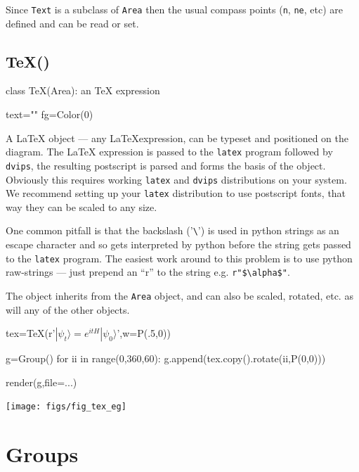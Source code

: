 \documentclass[a4paper]{book}
\begin{document}
Since \Verb|Text| is a subclass of \Verb|Area| then the usual compass points
(\Verb|n|, \Verb|ne|, etc) are defined and can be read or set.

\subsection{TeX()}
\label{sec:tex}
\begin{python}
class TeX(Area):
    an TeX expression

    text=""
    fg=Color(0)
\end{python}

A \LaTeX{} object --- any \LaTeX expression, can be typeset and
positioned on the diagram.  The \LaTeX{} expression is passed to the
\Verb|latex| program followed by \Verb|dvips|, the resulting
postscript is parsed and forms the basis of the object. Obviously this
requires working \Verb|latex| and \Verb|dvips| distributions on your
system. We recommend setting up your \Verb|latex| distribution to
use postscript fonts, that way they can be scaled to any size.

One common pitfall is that the backslash ('\Verb|\|') is used in python
strings as an escape character and so gets interpreted by python before
the string gets passed to the \Verb|latex| program. The easiest work
around to this problem is to use python raw-strings --- just prepend an
``r'' to the string e.g. \Verb|r"$\alpha$"|.

The object inherits from the \Verb|Area| object, and can also be
scaled, rotated, etc. as will any of the other objects.
\begin{example}
\begin{python}
tex=TeX(r'$|\psi_t\rangle=e^{itH}|\psi_0\rangle$',w=P(.5,0))

g=Group()
for ii in range(0,360,60):
    g.append(tex.copy().rotate(ii,P(0,0)))

render(g,file=...)
\end{python}
\begin{center}
  \texttt{[image: figs/fig\_tex\_eg]}
\end{center}
\end{example}
\section{Groups}
\end{document}
